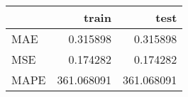 \begin{tabular}{lrr}
\toprule
{} &       train &        test \\
\midrule
MAE  &    0.315898 &    0.315898 \\
MSE  &    0.174282 &    0.174282 \\
MAPE &  361.068091 &  361.068091 \\
\bottomrule
\end{tabular}
